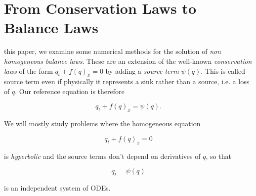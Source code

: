 \documentclass[journal,onecolumn]{IEEEtran}
\begin{document}
% 
% 
% 
\section{From Conservation Laws to Balance Laws}
 this paper, we examine some numerical methods for the solution of \textit{non homogeneous balance laws}. These are an extension of the well-known \textit{conservation laws} of the form $q_t+f(q)_x=0$ by adding a \textit{source term} $\psi(q)$. This is called source term even if physically it represents a sink rather than a source, i.e. a loss of $q$. Our reference equation is therefore

\begin{equation} \label{eq:template}
	q_t + f(q)_x = \psi(q).
\end{equation}

We will mostly study problems where the homogeneous equation

\begin{equation} \label{eq:hom}
	q_t +f(q)_x = 0
\end{equation}

is \textit{hyperbolic} and the source terms don't depend on derivatives of $q$, so that

\begin{equation} \label{eq:source}
	q_t = \psi(q)
\end{equation}

is an independent system of ODEs.








%
%
\end{document}
